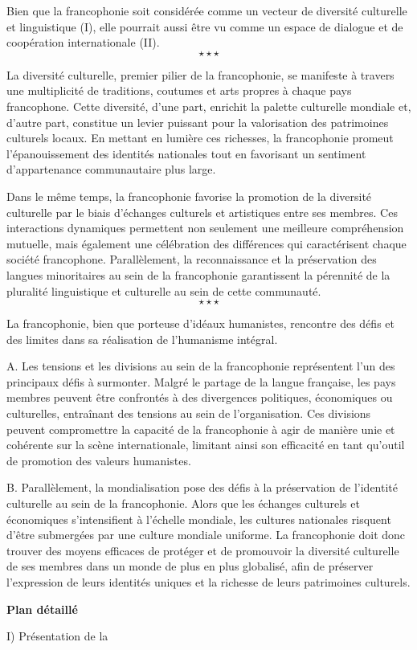 Bien que la francophonie soit considérée comme un vecteur de diversité culturelle et linguistique (I), elle pourrait aussi être vu comme un espace de dialogue et de coopération internationale (II).
$$\star \star \star$$

La diversité culturelle, premier pilier de la francophonie, se manifeste à travers une multiplicité de traditions, coutumes et arts propres à chaque pays francophone. Cette diversité, d'une part, enrichit la palette culturelle mondiale et, d'autre part, constitue un levier puissant pour la valorisation des patrimoines culturels locaux. En mettant en lumière ces richesses, la francophonie promeut l'épanouissement des identités nationales tout en favorisant un sentiment d'appartenance communautaire plus large.

Dans le même temps, la francophonie favorise la promotion de la diversité culturelle par le biais d'échanges culturels et artistiques entre ses membres. Ces interactions dynamiques permettent non seulement une meilleure compréhension mutuelle, mais également une célébration des différences qui caractérisent chaque société francophone. Parallèlement, la reconnaissance et la préservation des langues minoritaires au sein de la francophonie garantissent la pérennité de la pluralité linguistique et culturelle au sein de cette communauté.
$$\star \star \star$$

La francophonie, bien que porteuse d'idéaux humanistes, rencontre des défis et des limites dans sa réalisation de l'humanisme intégral.

A. Les tensions et les divisions au sein de la francophonie représentent l'un des principaux défis à surmonter. Malgré le partage de la langue française, les pays membres peuvent être confrontés à des divergences politiques, économiques ou culturelles, entraînant des tensions au sein de l'organisation. Ces divisions peuvent compromettre la capacité de la francophonie à agir de manière unie et cohérente sur la scène internationale, limitant ainsi son efficacité en tant qu'outil de promotion des valeurs humanistes.

B. Parallèlement, la mondialisation pose des défis à la préservation de l'identité culturelle au sein de la francophonie. Alors que les échanges culturels et économiques s'intensifient à l'échelle mondiale, les cultures nationales risquent d'être submergées par une culture mondiale uniforme. La francophonie doit donc trouver des moyens efficaces de protéger et de promouvoir la diversité culturelle de ses membres dans un monde de plus en plus globalisé, afin de préserver l'expression de leurs identités uniques et la richesse de leurs patrimoines culturels.

\begin{center}
	\textbf{Plan détaillé}
\end{center}
I) Présentation de la 
